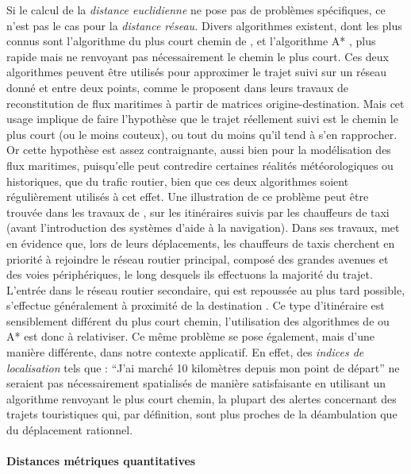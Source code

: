 Si le calcul de la \emph{distance euclidienne} ne pose pas de
problèmes spécifiques, ce n'est pas le cas pour la \emph{distance
  réseau.}  Divers algorithmes existent, dont les plus connus sont
l'algorithme du plus court chemin de \textcite{Dijkstra1959}, et
l'algorithme A* \autocite{Hart1968}, plus rapide mais ne renvoyant pas
nécessairement le chemin le plus court. Ces deux algorithmes peuvent
être utilisés pour approximer le trajet suivi sur un réseau donné et
entre deux points, comme le proposent \textcite{Berli2018, Bunel2018}
dans leurs travaux de reconstitution de flux maritimes à partir de
matrices origine-destination. Mais cet usage implique de faire
l'hypothèse que le trajet réellement suivi est le chemin le plus court
(ou le moins couteux), ou tout du moins qu'il tend à s'en
rapprocher. Or cette hypothèse est assez contraignante, aussi bien
pour la modélisation des flux maritimes, puisqu'elle peut contredire
certaines réalités météorologiques ou historiques, que du trafic
routier, bien que ces deux algorithmes soient régulièrement utilisés à
cet effet. Une illustration de ce problème peut être trouvée dans les
travaux de \textcite{Pailhous1970}, sur les itinéraires suivis par les
chauffeurs de taxi (avant l'introduction des systèmes d'aide à la
navigation). Dans ses travaux, \textcite{Pailhous1970} met en évidence
que, lors de leurs déplacements, les chauffeurs de taxis cherchent en
priorité à rejoindre le réseau routier principal, composé des grandes
avenues et des voies périphériques, le long desquels ils effectuons la
majorité du trajet. L'entrée dans le réseau routier secondaire, qui
est repoussée au plus tard possible, s'effectue généralement à
proximité de la destination \autocite{Lagesse2016}. Ce type
d'itinéraire est sensiblement différent du plus court chemin,
l'utilisation des algorithmes de \textcite{Dijkstra1959} ou A*
\autocite{Hart1968} est donc à relativiser. Ce même problème se pose
également, mais d'une manière différente, dans notre contexte
applicatif. En effet, des \emph{indices de localisation} tels que :
\enquote{J'ai marché 10 kilomètres depuis mon point de départ} ne
seraient pas nécessairement spatialisés de manière satisfaisante en
utilisant un algorithme renvoyant le plus court chemin, la plupart des
alertes concernant des trajets touristiques qui, par définition, sont
plus proches de la déambulation que du déplacement rationnel.

\paragraph{Distances métriques quantitatives}
\label{sec:3-1-dist_met_quant}

